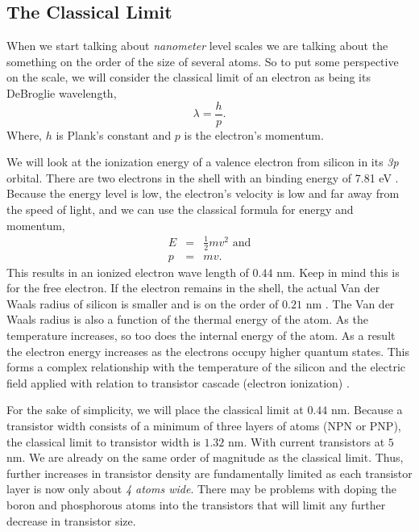 \documentclass[runningheads]{llncs}
\begin{document}
\subsection{The Classical Limit}
When we start talking about \emph{nanometer} level scales we are talking about the something on the order of the size of several atoms.
So to put some perspective on the scale, we will consider the classical limit of an electron as being its DeBroglie wavelength,
\begin{equation}
    \lambda = \frac{h}{p}.
\end{equation}
Where, $h$ is Plank's constant and $p$ is the electron's momentum.

We will look at the ionization energy of a valence electron from silicon in its \emph{3p} orbital.
There are two electrons in the shell with an binding energy of 7.81 eV \cite{shattuck2017ionization}.
Because the energy level is low, the electron's velocity is low and far away from the speed of light, and we can use the classical formula for energy and momentum,
\begin{eqnarray}
    E &=& \frac{1}{2} m v^2 \mbox{ and} \\
    p &=& mv.
\end{eqnarray}
This results in an ionized electron wave length of $0.44$ nm.
Keep in mind this is for the free electron.
If the electron remains in the shell, the actual Van der Waals radius of silicon is smaller and is on the order of $0.21$ nm \cite{VdW-Si}.
The Van der Waals radius is also a function of the thermal energy of the atom.
As the temperature increases, so too does the internal energy of the atom.
As a result the electron energy increases as the electrons occupy higher quantum states.
This forms a complex relationship with the temperature of the silicon and the electric field applied with relation to transistor cascade (electron ionization) \cite{maes1990impact}.

For the sake of simplicity, we will place the classical limit at $0.44$ nm.
Because a transistor width consists of a minimum of three layers of atoms (NPN or PNP), the classical limit to transistor width is $1.32$ nm.
With current transistors at $5$ nm. We are already on the same order of magnitude as the classical limit.
Thus, further increases in transistor density are fundamentally limited as each transistor layer is now only about \emph{4 atoms wide}.
There may be problems with doping the boron and phosphorous atoms into the transistors that will limit any further decrease in transistor size.
\end{document}
